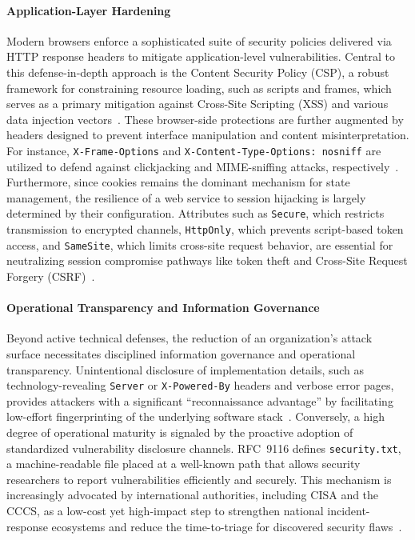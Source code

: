 \documentclass[a4paper,fleqn]{cas-sc}
\begin{document}
    \paragraph{Application-Layer Hardening} 
    Modern browsers enforce a sophisticated suite of security policies delivered via HTTP response headers to mitigate application-level vulnerabilities. Central to this defense-in-depth approach is the Content Security Policy (CSP), a robust framework for constraining resource loading, such as scripts and frames, which serves as a primary mitigation against Cross-Site Scripting (XSS) and various data injection vectors~\cite{owasp_csp_cheatsheet, mdn_csp_guide}. These browser-side protections are further augmented by headers designed to prevent interface manipulation and content misinterpretation. For instance, \texttt{X-Frame-Options} and \texttt{X-Content-Type-Options: nosniff} are utilized to defend against clickjacking and MIME-sniffing attacks, respectively~\cite{owasp_http_security_response_headers}. Furthermore, since cookies remains the dominant mechanism for state management, the resilience of a web service to session hijacking is largely determined by their configuration. Attributes such as \texttt{Secure}, which restricts transmission to encrypted channels, \texttt{HttpOnly}, which prevents script-based token access, and \texttt{SameSite}, which limits cross-site request behavior, are essential for neutralizing session compromise pathways like token theft and Cross-Site Request Forgery (CSRF)~\cite{mdn_secure_cookie_configuration, owasp_session_management_cookies}.

    \paragraph{Operational Transparency and Information Governance} 
    Beyond active technical defenses, the reduction of an organization's attack surface necessitates disciplined information governance and operational transparency. Unintentional disclosure of implementation details, such as technology-revealing \texttt{Server} or \texttt{X-Powered-By} headers and verbose error pages, provides attackers with a significant ``reconnaissance advantage'' by facilitating low-effort fingerprinting of the underlying software stack~\cite{owasp_secure_headers_project, cwe_209}. Conversely, a high degree of operational maturity is signaled by the proactive adoption of standardized vulnerability disclosure channels. RFC~9116 defines \texttt{security.txt}, a machine-readable file placed at a well-known path that allows security researchers to report vulnerabilities efficiently and securely. This mechanism is increasingly advocated by international authorities, including CISA and the CCCS, as a low-cost yet high-impact step to strengthen national incident-response ecosystems and reduce the time-to-triage for discovered security flaws~\cite{rfc9116, cisa_securitytxt_simple_file_big_value, cccs-itsm-60005}.
\end{document}
